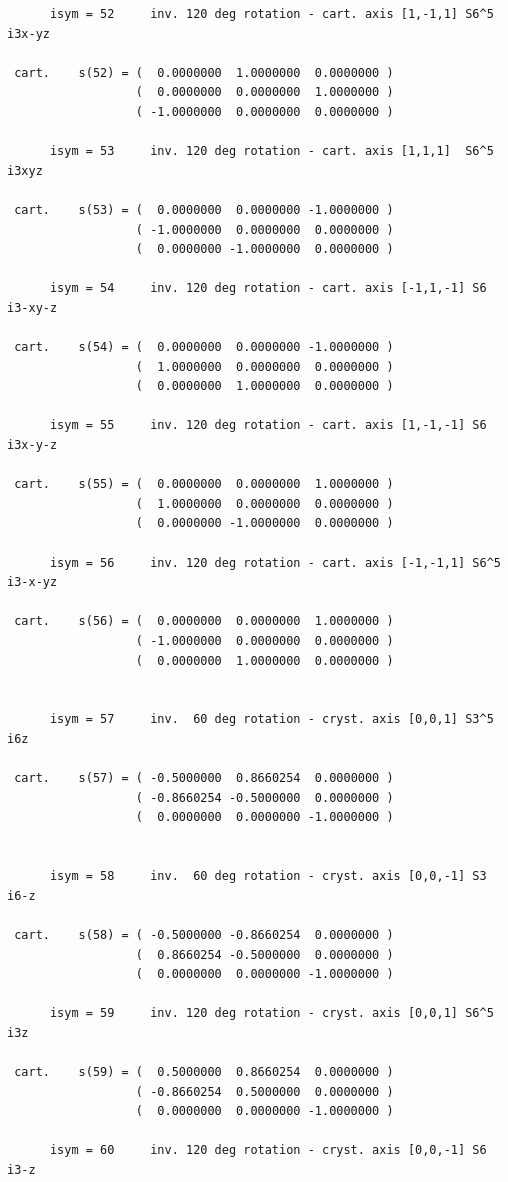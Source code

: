 \documentclass[12pt,a4paper]{article}
\begin{document}
\begin{verbatim}
      isym = 52     inv. 120 deg rotation - cart. axis [1,-1,1] S6^5   i3x-yz

 cart.    s(52) = (  0.0000000  1.0000000  0.0000000 )
                  (  0.0000000  0.0000000  1.0000000 )
                  ( -1.0000000  0.0000000  0.0000000 )

      isym = 53     inv. 120 deg rotation - cart. axis [1,1,1]  S6^5   i3xyz

 cart.    s(53) = (  0.0000000  0.0000000 -1.0000000 )
                  ( -1.0000000  0.0000000  0.0000000 )
                  (  0.0000000 -1.0000000  0.0000000 )

      isym = 54     inv. 120 deg rotation - cart. axis [-1,1,-1] S6    i3-xy-z

 cart.    s(54) = (  0.0000000  0.0000000 -1.0000000 )
                  (  1.0000000  0.0000000  0.0000000 )
                  (  0.0000000  1.0000000  0.0000000 )

      isym = 55     inv. 120 deg rotation - cart. axis [1,-1,-1] S6    i3x-y-z

 cart.    s(55) = (  0.0000000  0.0000000  1.0000000 )
                  (  1.0000000  0.0000000  0.0000000 )
                  (  0.0000000 -1.0000000  0.0000000 )

      isym = 56     inv. 120 deg rotation - cart. axis [-1,-1,1] S6^5  i3-x-yz

 cart.    s(56) = (  0.0000000  0.0000000  1.0000000 )
                  ( -1.0000000  0.0000000  0.0000000 )
                  (  0.0000000  1.0000000  0.0000000 )


      isym = 57     inv.  60 deg rotation - cryst. axis [0,0,1] S3^5   i6z

 cart.    s(57) = ( -0.5000000  0.8660254  0.0000000 )
                  ( -0.8660254 -0.5000000  0.0000000 )
                  (  0.0000000  0.0000000 -1.0000000 )


      isym = 58     inv.  60 deg rotation - cryst. axis [0,0,-1] S3    i6-z

 cart.    s(58) = ( -0.5000000 -0.8660254  0.0000000 )
                  (  0.8660254 -0.5000000  0.0000000 )
                  (  0.0000000  0.0000000 -1.0000000 )

      isym = 59     inv. 120 deg rotation - cryst. axis [0,0,1] S6^5   i3z

 cart.    s(59) = (  0.5000000  0.8660254  0.0000000 )
                  ( -0.8660254  0.5000000  0.0000000 )
                  (  0.0000000  0.0000000 -1.0000000 )

      isym = 60     inv. 120 deg rotation - cryst. axis [0,0,-1] S6    i3-z


\end{verbatim}
\end{document}
